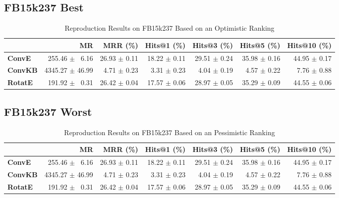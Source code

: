 \documentclass[journal]{IEEEtran}
\begin{document}
\subsection{FB15k237 Best}
\begin{table*}
    \caption{Reproduction Results on FB15k237 Based on an Optimistic Ranking}
    \label{tab:fb15k237_full_results_optimistic_ranking}
    \centering
    \begin{tabular}{lrrrrrr}
\toprule
{} &               MR &      MRR (\%) &   Hits@1 (\%) &   Hits@3 (\%) &   Hits@5 (\%) &  Hits@10 (\%) \\
\midrule
\textbf{ConvE } &  $\phantom{5}$255.46 $\pm$ $\phantom{5}$6.16 &  26.93 $\pm$ 0.11 &  18.22 $\pm$ 0.11 &  29.51 $\pm$ 0.24 &  35.98 $\pm$ 0.16 &  44.95 $\pm$ 0.17 \\
\textbf{ConvKB} &  4345.27 $\pm$ 46.99 &  $\phantom{5}$4.71 $\pm$ 0.23 &  $\phantom{5}$3.31 $\pm$ 0.23 &  $\phantom{5}$4.04 $\pm$ 0.19 &  $\phantom{5}$4.57 $\pm$ 0.22 &  $\phantom{5}$7.76 $\pm$ 0.88 \\
\textbf{RotatE} &  $\phantom{5}$191.92 $\pm$ $\phantom{5}$0.31 &  26.42 $\pm$ 0.04 &  17.57 $\pm$ 0.06 &  28.97 $\pm$ 0.05 &  35.29 $\pm$ 0.09 &  44.55 $\pm$ 0.06 \\
\bottomrule
\end{tabular}

\end{table*}
\subsection{FB15k237 Worst}
    \begin{table*}
        \caption{Reproduction Results on FB15k237 Based on an Pessimistic Ranking}
        \label{tab:fb15k237_full_results_pessimistic_ranking}
        \centering
        \begin{tabular}{lrrrrrr}
\toprule
{} &               MR &      MRR (\%) &   Hits@1 (\%) &   Hits@3 (\%) &   Hits@5 (\%) &  Hits@10 (\%) \\
\midrule
\textbf{ConvE } &  $\phantom{5}$255.46 $\pm$ $\phantom{5}$6.16 &  26.93 $\pm$ 0.11 &  18.22 $\pm$ 0.11 &  29.51 $\pm$ 0.24 &  35.98 $\pm$ 0.16 &  44.95 $\pm$ 0.17 \\
\textbf{ConvKB} &  4345.27 $\pm$ 46.99 &  $\phantom{5}$4.71 $\pm$ 0.23 &  $\phantom{5}$3.31 $\pm$ 0.23 &  $\phantom{5}$4.04 $\pm$ 0.19 &  $\phantom{5}$4.57 $\pm$ 0.22 &  $\phantom{5}$7.76 $\pm$ 0.88 \\
\textbf{RotatE} &  $\phantom{5}$191.92 $\pm$ $\phantom{5}$0.31 &  26.42 $\pm$ 0.04 &  17.57 $\pm$ 0.06 &  28.97 $\pm$ 0.05 &  35.29 $\pm$ 0.09 &  44.55 $\pm$ 0.06 \\
\bottomrule
\end{tabular}

    \end{table*}
\end{document}
